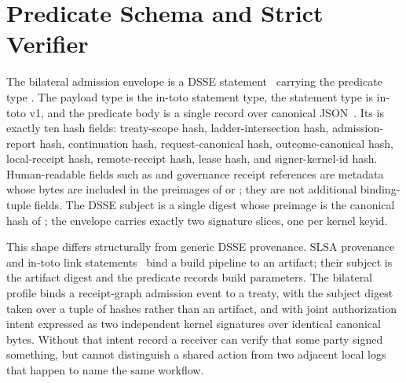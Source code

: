 \section{Predicate Schema and Strict Verifier}
\label{sec:predicate}

The bilateral admission envelope is a DSSE statement~\cite{dsse} carrying the predicate type . The payload type is the in-toto statement type, the statement type is in-toto v1, and the predicate body is a single record over canonical JSON~\cite{rfc8785}. Its  is exactly ten hash fields: treaty-scope hash, ladder-intersection hash, admission-report hash, continuation hash, request-canonical hash, outcome-canonical hash, local-receipt hash, remote-receipt hash, lease hash, and signer-kernel-id hash. Human-readable fields such as  and governance receipt references are metadata whose bytes are included in the preimages of  or ; they are not additional binding-tuple fields. The DSSE subject is a single digest whose preimage is the canonical hash of ; the envelope carries exactly two signature slices, one per kernel keyid.

This shape differs structurally from generic DSSE provenance. SLSA provenance and in-toto link statements~\cite{slsa,torres2019intoto} bind a build pipeline to an artifact; their subject is the artifact digest and the predicate records build parameters. The bilateral profile binds a receipt-graph admission event to a treaty, with the subject digest taken over a tuple of hashes rather than an artifact, and with joint authorization intent expressed as two independent kernel signatures over identical canonical bytes. Without that intent record a receiver can verify that some party signed something, but cannot distinguish a shared action from two adjacent local logs that happen to name the same workflow.

